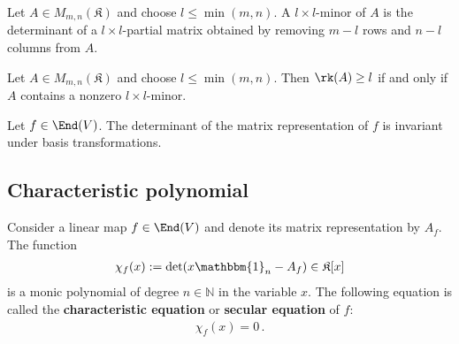     \begin{adefinition}[Minor]
        Let $A\in M_{m,n}(\mathfrak{K})$ and choose $l\leq\min(m,n)$. A $l\times l$-minor of $A$ is the determinant of a $l\times l$-partial matrix obtained by removing $m-l$ rows and $n-l$ columns from $A$.
    \end{adefinition}
    \begin{property}
        Let $A\in M_{m,n}(\mathfrak{K})$ and choose $l\leq\min(m,n)$. Then $\rk(A)\geq l$ if and only if $A$ contains a nonzero $l\times l$-minor.
    \end{property}

    \begin{property}
        Let $f\in\End(V)$. The determinant of the matrix representation of $f$ is invariant under basis transformations.
    \end{property}

\subsection{Characteristic polynomial}

    \begin{definition}\label{linalgebra:characteristic_polynomial}
        Consider a linear map $f\in\End(V)$ and denote its matrix representation by $A_f$. The function
        \begin{gather}
            \chi_f(x) := \det(x\mathbbm{1}_n-A_f)\in\mathfrak{K}[x]
        \end{gather}
        is a monic polynomial of degree $n\in\mathbb{N}$ in the variable $x$. The following equation is called the \textbf{characteristic equation} or \textbf{secular equation} of $f$:
        \begin{gather}
            \label{linalgebra:characteristic_equation}
            \chi_f(x) = 0\,.
        \end{gather}
    \end{definition}

